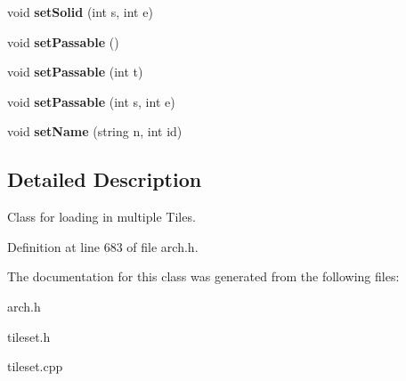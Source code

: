 \begin{DoxyCompactItemize}
\item 
void {\bfseries set\+Solid} (int s, int e)\hypertarget{classTileset_a6d40a14146a3dedd0217a412a66f4c9a}{}\label{classTileset_a6d40a14146a3dedd0217a412a66f4c9a}

\item 
void {\bfseries set\+Passable} ()\hypertarget{classTileset_a9fc3756317f238121769629ea20a9849}{}\label{classTileset_a9fc3756317f238121769629ea20a9849}

\item 
void {\bfseries set\+Passable} (int t)\hypertarget{classTileset_a231401092d65e28b7dea12e97e3232ad}{}\label{classTileset_a231401092d65e28b7dea12e97e3232ad}

\item 
void {\bfseries set\+Passable} (int s, int e)\hypertarget{classTileset_a84b12096b06c7162ca4bb9058a232d21}{}\label{classTileset_a84b12096b06c7162ca4bb9058a232d21}

\item 
void {\bfseries set\+Name} (string n, int id)\hypertarget{classTileset_ad5f3a60a84cec25c6e11856a7cd36d84}{}\label{classTileset_ad5f3a60a84cec25c6e11856a7cd36d84}

\end{DoxyCompactItemize}


\subsection{Detailed Description}
Class for loading in multiple Tiles. 

Definition at line 683 of file arch.\+h.



The documentation for this class was generated from the following files\+:\begin{DoxyCompactItemize}
\item 
arch.\+h\item 
tileset.\+h\item 
tileset.\+cpp\end{DoxyCompactItemize}
